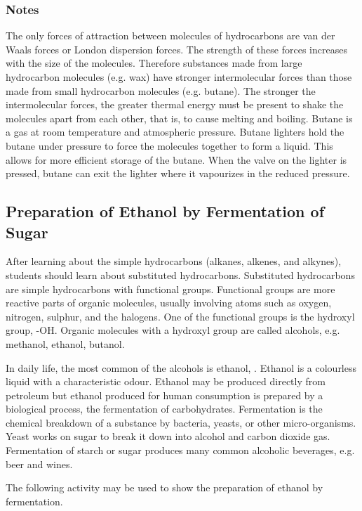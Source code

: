 \subsubsection*{Notes}
The only forces of attraction between molecules of hydrocarbons are van der Waals forces or London dispersion forces. The strength of these forces increases with the size of the molecules. Therefore substances made from large hydrocarbon molecules (e.g. wax) have stronger intermolecular forces than those made from small hydrocarbon molecules (e.g. butane). The stronger the intermolecular forces, the greater thermal energy must be present to shake the molecules apart from each other, that is, to cause melting and boiling.
Butane is a gas at room temperature and atmospheric pressure. Butane lighters hold the butane under pressure to force the molecules together to form a liquid. This allows for more efficient storage of the butane. When the valve on the lighter is pressed, butane can exit the lighter where it vapourizes in the reduced pressure.

\subsection{Preparation of Ethanol by Fermentation of Sugar}

After learning about the simple hydrocarbons (alkanes, alkenes, and alkynes), students should learn about substituted hydrocarbons. Substituted hydrocarbons are simple hydrocarbons with functional groups. Functional groups are more reactive parts of organic molecules, usually involving atoms such as oxygen, nitrogen, sulphur, and the halogens. One of the functional groups is the hydroxyl group, -OH. Organic molecules with a hydroxyl group are called alcohols, e.g. methanol, ethanol, butanol.

In daily life, the most common of the alcohols is ethanol, . Ethanol is a colourless liquid with a characteristic odour. Ethanol may be produced directly from petroleum but ethanol produced for human consumption is prepared by a biological process, the fermentation of carbohydrates. Fermentation is the chemical breakdown of a substance by bacteria, yeasts, or other micro-organisms. Yeast works on sugar to break it down into alcohol and carbon dioxide gas. Fermentation of starch or sugar produces many common alcoholic beverages, e.g. beer and wines.

The following activity may be used to show the preparation of ethanol by fermentation.

